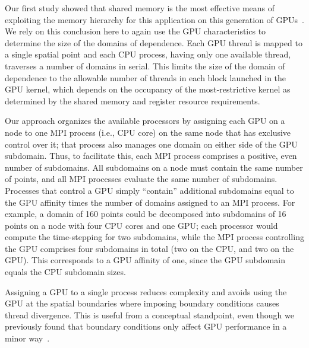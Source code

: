 Our first study showed that shared memory is the most effective means of exploiting the memory hierarchy
for this application on this generation of GPUs~\cite{OurJCP}.
We rely on this conclusion here to again use the GPU characteristics to determine the size of the
domains of dependence.
Each GPU thread is mapped to a single spatial point and each CPU process, having only one available thread,
traverses a number of domains in serial.
This limits the size of the domain of dependence to the allowable number of threads in each block launched
in the GPU kernel, which depends on the occupancy of the most-restrictive kernel as determined by the shared
memory and register resource requirements.


Our approach organizes the available processors by assigning each GPU on a node to one
MPI process (i.e., CPU core) on the same node that has exclusive control over it; that process also
manages one domain on either side of the GPU subdomain.
Thus, to facilitate this, each MPI process comprises a positive, even number of subdomains.
All subdomains on a node must contain the same number of points, and all MPI processes evaluate the
same number of subdomains.
Processes that control a GPU simply ``contain'' additional subdomains equal to the GPU affinity times
the number of domains assigned to an MPI process.
For example, a domain of 160 points could be decomposed into subdomains of 16 points on a node with
four CPU cores and one GPU; each processor would compute the time-stepping for two subdomains, while the
MPI process controlling the GPU comprises four subdomains in total (two on the CPU, and two on the GPU).
This corresponds to a GPU affinity of one, since the GPU subdomain equals the CPU subdomain sizes.

Assigning a GPU to a single process reduces complexity and avoids using the GPU at the spatial
boundaries where imposing boundary conditions causes thread divergence.
This is useful from a conceptual standpoint, even though we previously found that boundary
conditions only affect GPU performance in a minor way~\cite{OurJCP}.


